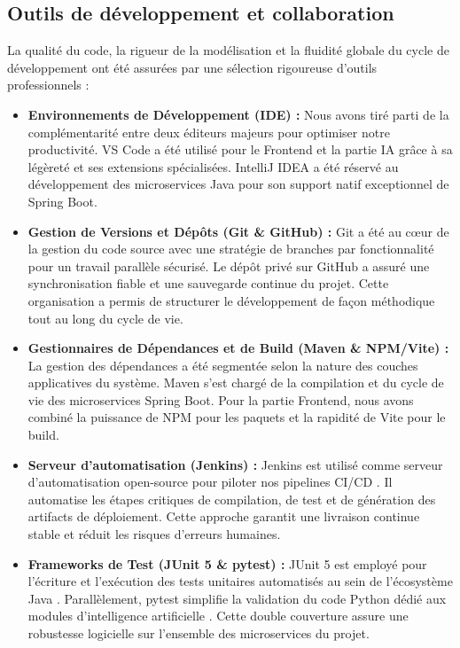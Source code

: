 \subsection{Outils de développement et collaboration}
La qualité du code, la rigueur de la modélisation et la fluidité globale du cycle de développement ont été assurées par une sélection rigoureuse d'outils professionnels :

\begin{itemize}
    \item \textbf{Environnements de Développement (IDE) :}  
    Nous avons tiré parti de la complémentarité entre deux éditeurs majeurs pour optimiser notre productivité. VS Code a été utilisé pour le Frontend et la partie IA grâce à sa légèreté et ses extensions spécialisées. IntelliJ IDEA a été réservé au développement des microservices Java pour son support natif exceptionnel de Spring Boot.
    
    \item \textbf{Gestion de Versions et Dépôts (Git \& GitHub) :}  
    Git a été au cœur de la gestion du code source avec une stratégie de branches par fonctionnalité pour un travail parallèle sécurisé. Le dépôt privé sur GitHub a assuré une synchronisation fiable et une sauvegarde continue du projet. Cette organisation a permis de structurer le développement de façon méthodique tout au long du cycle de vie.
    
    \item \textbf{Gestionnaires de Dépendances et de Build (Maven \& NPM/Vite) :}  
    La gestion des dépendances a été segmentée selon la nature des couches applicatives du système. Maven s’est chargé de la compilation et du cycle de vie des microservices Spring Boot. Pour la partie Frontend, nous avons combiné la puissance de NPM pour les paquets et la rapidité de Vite pour le build.
    
    \item \textbf{Serveur d'automatisation (Jenkins) :}
    Jenkins est utilisé comme serveur d’automatisation open-source pour piloter nos pipelines CI/CD \cite{jenkins2015continuous}. Il automatise les étapes critiques de compilation, de test et de génération des artifacts de déploiement. Cette approche garantit une livraison continue stable et réduit les risques d'erreurs humaines.
    
    \item \textbf{Frameworks de Test (JUnit 5 \& pytest) :}
    JUnit 5 est employé pour l'écriture et l'exécution des tests unitaires automatisés au sein de l'écosystème Java \cite{kleuker2019junit5}. Parallèlement, pytest simplifie la validation du code Python dédié aux modules d'intelligence artificielle \cite{pytest_docs}. Cette double couverture assure une robustesse logicielle sur l'ensemble des microservices du projet.
    

\end{itemize}
